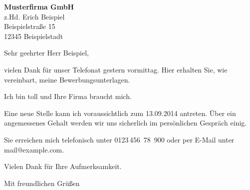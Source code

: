 \documentclass[a4paper, parskip=full*, fromalign=right, fromphone, fromemail]{scrlttr2}
\begin{document}
\pagestyle{plain}
\begin{letter}{\textbf{Musterfirma GmbH}\\z.Hd. Erich Beispiel\\Beispielstraße 15\\12345 Beispielstadt} 
\opening{Sehr geehrter Herr Beispiel,} 
vielen Dank für unser Telefonat gestern vormittag. Hier erhalten Sie, wie vereinbart, meine Bewerbungsunterlagen.

Ich bin toll und Ihre Firma braucht mich.

Eine neue Stelle kann ich voraussichtlich zum 13.09.2014 antreten. Über ein angemessenes Gehalt werden wir uns sicherlich im persönlichen Gespräch einig.

Sie erreichen mich telefonisch unter 0123\,456~78~900 oder per E-Mail unter mail@example.com.

Vielen Dank für Ihre Aufmerksamkeit.

\closing{Mit freundlichen Grüßen}
\end{letter} 
\end{document}

